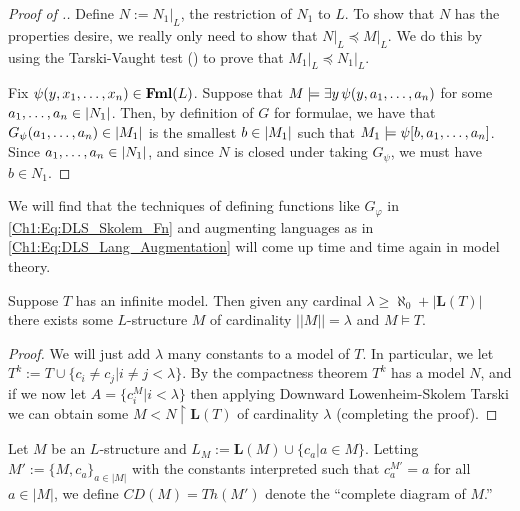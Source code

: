 \begin{proof}[Proof of .]
    Define $N := N_1\vert_{L}$, the restriction of $N_1$ to $L$. To show that $N$ has the properties desire, we really only need to show that $N\vert_L \preceq M \vert_L$. We do this by using the Tarski-Vaught test () to prove that $M_1\vert_{L} \preceq N_1\vert_{L}$.

    Fix $\psi\!\left( y, x_1, \ldots, x_n \right) \in \mathbf{Fml}(L)$. Suppose that $M \models \exists y \, \psi\!\left( y, a_1, \ldots, a_n \right)$ for some $a_1, \ldots, a_n \in \left\lvert N_1 \right\rvert$. Then, by definition of $G$ for formulae, we have that $G_{\psi}\!\left( a_1, \ldots, a_n \right) \in \left\lvert M_1 \right\rvert$ is the smallest $b \in \left\lvert M_1 \right\rvert$ such that $M_1 \models \psi\!\left[ b, a_1, \ldots, a_n \right]$. Since $a_1, \ldots, a_n \in \left\lvert N_1 \right\rvert$, and since $N$ is closed under taking $G_{\psi}$, we must have $b \in N_1$.
    
\end{proof}

We will find that the techniques of defining functions like $G_{\varphi}$ in \eqref{Ch1:Eq:DLS_Skolem_Fn} and augmenting languages as in \eqref{Ch1:Eq:DLS_Lang_Augmentation} will come up time and time again in model theory.

\begin{boxtheorem}
    Suppose $T$ has an infinite model. Then given any cardinal $\lambda \geq \aleph_0+|\textbf{L}(T)|$ there exists some $L$-structure $M$ of cardinality $||M||=\lambda$ and $M\models T$.
\end{boxtheorem}

\begin{proof}
    We will just add $\lambda$ many constants to a model of $T$. In particular, we let $T^k:=T\cup\{c_i\neq c_j|i\neq j<\lambda\}$. By the compactness theorem $T^k$ has a model $N$, and if we now let $A=\{c_i^M| i<\lambda\}$ then applying Downward Lowenheim-Skolem Tarski we can obtain some $M<N\restriction \textbf{L}(T)$ of cardinality $\lambda$ (completing the proof).
\end{proof}

\begin{boxdefinition}
    Let $M$ be an $L$-structure and $L_M:=\textbf{L}(M)\cup \{c_a|a\in M\}$. Letting $M':=\{ M, c_a\}_{a\in |M|}$ with the constants interpreted such that $c_a^{M'}=a$ for all $a\in |M|$, we define $CD(M)=Th(M')$ denote the ``complete diagram of $M$.''
 \end{boxdefinition}

